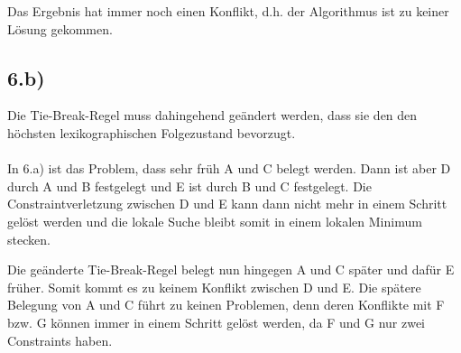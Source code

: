 \documentclass[a4paper]{article}
\begin{document}
  
  Das Ergebnis hat immer noch einen Konflikt, d.h. der Algorithmus ist zu keiner Lösung gekommen.
  
\subsection*{6.b)}
Die Tie-Break-Regel muss dahingehend ge\"andert werden, dass sie den den höchsten lexikographischen Folgezustand bevorzugt.\\
\\
In 6.a) ist das Problem, dass sehr fr\"uh A und C belegt werden. Dann ist aber D durch A und B festgelegt und E ist durch B und C festgelegt. Die Constraintverletzung zwischen D und E kann dann nicht mehr in einem Schritt gel\"ost werden und die lokale Suche bleibt somit in einem lokalen Minimum stecken.

Die ge\"anderte Tie-Break-Regel belegt nun hingegen A und C sp\"ater und daf\"ur E fr\"uher. Somit kommt es zu keinem Konflikt zwischen D und E. Die sp\"atere Belegung von A und C f\"uhrt zu keinen Problemen, denn deren Konflikte mit F bzw. G k\"onnen immer in einem Schritt gel\"ost werden, da F und G nur zwei Constraints haben.
\end{document}
